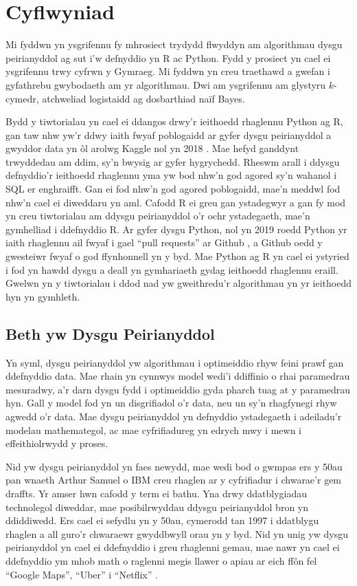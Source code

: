 \chapter{Cyflwyniad}\label{cha:introduction}

Mi fyddwn yn ysgrifennu fy mhrosiect trydydd flwyddyn am algorithmau dysgu peirianyddol ag sut i'w defnyddio yn R ac Python. Fydd y prosiect yn cael ei ysgrifennu trwy cyfrwn y Gymraeg. Mi fyddwn yn creu traethawd a gwefan i gyfathrebu gwybodaeth am yr algorithmau. Dwi am ysgrifennu am glystyru $k$-cymedr, atchweliad logistaidd ag dosbarthiad na\"{i}f Bayes.

Bydd y tiwtorialau yn cael ei ddangos drwy'r ieithoedd rhaglennu Python ag R, gan taw nhw yw'r ddwy iaith fwyaf poblogaidd ar gyfer dysgu peirianyddol a gwyddor data yn \^{o}l arolwg Kaggle nol yn 2018 \cite{kagglesurvey}. Mae hefyd ganddynt trwyddedau am ddim, sy'n bwysig ar gyfer hygrychedd. Rheswm arall i ddysgu defnyddio'r ieithoedd rhaglennu yma yw bod nhw'n god agored sy'n wahanol i SQL er enghraifft. Gan ei fod nhw'n god agored poblogaidd, mae'n meddwl fod nhw'n cael ei diweddaru yn aml. Cafodd R ei greu gan ystadegwyr a gan fy mod yn creu tiwtorialau am ddysgu peirianyddol o'r ochr ystadegaeth, mae'n gymhelliad i ddefnyddio R. Ar gyfer dysgu Python, nol yn 2019 roedd Python yr iaith rhaglennu ail fwyaf i gael ``pull requests'' ar Github \cite{canran-github}, a Github oedd y gwesteiwr fwyaf o god ffynhonnell yn y byd. Mae Python ag R yn cael ei ystyried i fod yn hawdd dysgu a deall yn gymhariaeth gydag ieithoedd rhaglennu eraill. Gwelwn yn y tiwtorialau i ddod nad yw gweithredu'r algorithmau yn yr ieithoedd hyn yn gymhleth.

\section{Beth yw Dysgu Peirianyddol}\label{sec:intro_pd}

Yn syml, dysgu peirianyddol yw algorithmau i optimeiddio rhyw feini prawf gan ddefnyddio data. Mae rhain yn cynnwys model wedi'i ddiffinio o rhai paramedrau mesuradwy, a'r darn dysgu fydd i optimeiddio gyda pharch tuag at y paramedrau hyn. Gall y model fod yn un disgrifiadol o'r data, neu un sy'n rhagfynegi rhyw agwedd o'r data. Mae dysgu peirianyddol yn defnyddio ystadegaeth i adeiladu'r modelau mathemategol, ac mae cyfrifiadureg yn edrych mwy i mewn i effeithiolrwydd y proses.\cite{dysgu-peirianyddol2}

Nid yw dysgu peirianyddol yn faes newydd, mae wedi bod o gwmpas ers y 50au pan wnaeth Arthur Samuel o IBM creu rhaglen ar y cyfrifiadur i chwarae'r gem draffts. Yr amser hwn cafodd y term ei bathu. Yna drwy ddatblygiadau technolegol diweddar, mae posibilrwyddau ddysgu peirianyddol bron yn ddiddiwedd. Ers cael ei sefydlu yn y 50au, cymerodd tan 1997 i ddatblygu rhaglen a all guro'r chwaraewr gwyddbwyll orau yn y byd. Nid yn unig yw dysgu peirianyddol yn cael ei ddefnyddio i greu rhaglenni gemau, mae nawr yn cael ei ddefnyddio ym mhob math o raglenni megis llawer o apiau ar eich ff\^{o}n fel ``Google Maps'', ``Uber'' i ``Netflix'' \cite{cymwysiadaudysgupeirianyddol}.

